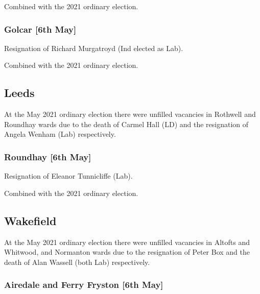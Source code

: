 \documentclass[a4paper,openany]{book}
\begin{document}
\begin{resultsiii}
Combined with the 2021 ordinary election.

\subsubsection*{Golcar \hspace*{\fill}\nolinebreak[1]%
	\enspace\hspace*{\fill}
	[6th May]}


Resignation of Richard Murgatroyd (Ind elected as Lab).

Combined with the 2021 ordinary election.

\subsection*{Leeds}

At the May 2021 ordinary election there were unfilled vacancies in Rothwell and Roundhay wards due to the death of Carmel Hall (LD) and the resignation of Angela Wenham (Lab) respectively.

\subsubsection*{Roundhay \hspace*{\fill}\nolinebreak[1]%
	\enspace\hspace*{\fill}
	[6th May]}


Resignation of Eleanor Tunnicliffe (Lab).

Combined with the 2021 ordinary election.

\subsection*{Wakefield}

At the May 2021 ordinary election there were unfilled vacancies in Altofts and Whitwood, and Normanton wards due to the resignation of Peter Box and the death of Alan Wassell (both Lab) respectively.

\subsubsection*{Airedale and Ferry Fryston \hspace*{\fill}\nolinebreak[1]%
	\enspace\hspace*{\fill}
	[6th May]}


\end{resultsiii}
\end{document}

